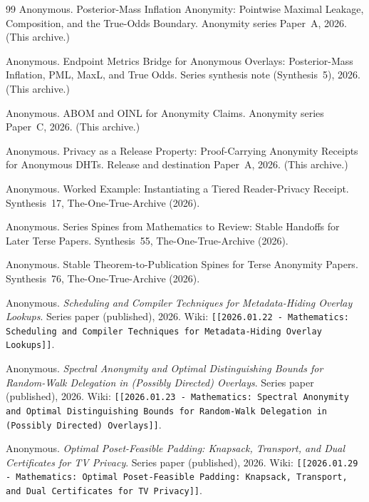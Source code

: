 \documentclass[11pt]{article}
\begin{document}
\begin{thebibliography}{99}
Anonymous.
\newblock Posterior-Mass Inflation Anonymity: Pointwise Maximal Leakage, Composition, and the True-Odds Boundary.
\newblock Anonymity series Paper~A, 2026. (This archive.)

Anonymous.
\newblock Endpoint Metrics Bridge for Anonymous Overlays: Posterior-Mass Inflation, PML, MaxL, and True Odds.
\newblock Series synthesis note (Synthesis~5), 2026. (This archive.)

Anonymous.
\newblock ABOM and OINL for Anonymity Claims.
\newblock Anonymity series Paper~C, 2026. (This archive.)

Anonymous.
\newblock Privacy as a Release Property: Proof-Carrying Anonymity Receipts for Anonymous DHTs.
\newblock Release and destination Paper~A, 2026. (This archive.)

Anonymous.
\newblock Worked Example: Instantiating a Tiered Reader-Privacy Receipt.
\newblock Synthesis~17, The-One-True-Archive (2026).

Anonymous.
\newblock Series Spines from Mathematics to Review: Stable Handoffs for Later Terse Papers.
\newblock Synthesis~55, The-One-True-Archive (2026).

Anonymous.
\newblock Stable Theorem-to-Publication Spines for Terse Anonymity Papers.
\newblock Synthesis~76, The-One-True-Archive (2026).

Anonymous.
\newblock \emph{Scheduling and Compiler Techniques for Metadata-Hiding Overlay Lookups}.
\newblock Series paper (published), 2026.
\newblock Wiki: \texttt{[[2026.01.22 - Mathematics: Scheduling and Compiler Techniques for Metadata-Hiding Overlay Lookups]]}.

Anonymous.
\newblock \emph{Spectral Anonymity and Optimal Distinguishing Bounds for Random-Walk Delegation in (Possibly Directed) Overlays}.
\newblock Series paper (published), 2026.
\newblock Wiki: \texttt{[[2026.01.23 - Mathematics: Spectral Anonymity and Optimal Distinguishing Bounds for Random-Walk Delegation in (Possibly Directed) Overlays]]}.

Anonymous.
\newblock \emph{Optimal Poset-Feasible Padding: Knapsack, Transport, and Dual Certificates for TV Privacy}.
\newblock Series paper (published), 2026.
\newblock Wiki: \texttt{[[2026.01.29 - Mathematics: Optimal Poset-Feasible Padding: Knapsack, Transport, and Dual Certificates for TV Privacy]]}.


\end{thebibliography}
\end{document}
